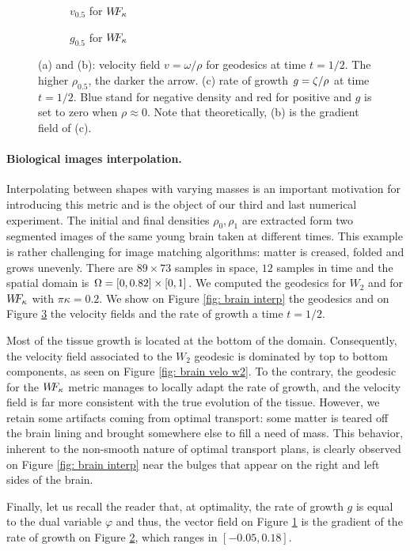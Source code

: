 \begin{figure}
\begin{subfigure}{0.3\linewidth}
{}
\caption{$v_{0.5}$ for $W\! \! F_{\kappa}$}
\label{fig: brain velo wf}
\end{subfigure}%
%
\begin{subfigure}{0.33\linewidth} 
\centering
\caption{$g_{0.5}$ for $W\! \! F_{\kappa}$}
\label{fig: brain g wf}
\end{subfigure}

\caption{(a) and (b): velocity field $v=\omega/\rho$ for geodesics at time $t=1/2$. The higher $\rho_{0.5}$, the darker the arrow. (c) rate of growth $g=\zeta/\rho$ at time $t=1/2$. Blue stand for negative density and red for positive and $g$ is set to zero when $\rho \approx 0$. Note that theoretically, (b) is the gradient field of (c).}
\label{fig: brain details}
\end{figure}

\paragraph{Biological images interpolation.}
Interpolating between shapes with varying masses is an important motivation for introducing this metric and is the object of our third and last numerical experiment. The initial and final densities $\rho_0, \rho_1$ are extracted form two segmented images of the same young brain taken at different times. This example is rather challenging for image matching algorithms: matter is creased, folded and grows unevenly. There are $89 \times 73$ samples in space, $12$ samples in time and the spatial domain is $\Omega=[0,0.82]\times [0,1]$. We computed the geodesics for $W_2$ and for $W\! \! F_{\kappa}$ with $\pi\kappa = 0.2$. We show on Figure \ref{fig: brain interp} the geodesics and on Figure \ref{fig: brain details} the velocity fields and the rate of growth a time $t=1/2$.

Most of the tissue growth is located at the bottom of the domain. Consequently, the velocity field associated to the $W_2$ geodesic is dominated by top to bottom components, as seen on Figure \ref{fig: brain velo w2}. To the contrary, the geodesic for the $W\! \! F_{\kappa}$ metric manages to locally adapt the rate of growth, and the velocity field is far more consistent with the true evolution of the tissue. However, we retain some artifacts coming from optimal transport: some matter is teared off the brain lining and brought somewhere else to fill a need of mass. This behavior, inherent to the non-smooth nature of optimal transport plans, is clearly observed on Figure \ref{fig: brain interp} near the bulges that appear on the right and left sides of the brain.

Finally, let us recall the reader that, at optimality, the rate of growth $g$ is equal to the dual variable $\varphi$ and thus, the vector field on Figure \ref{fig: brain velo wf} is the gradient of the rate of growth on Figure \ref{fig: brain g wf}, which ranges in $[-0.05,0.18]$.



